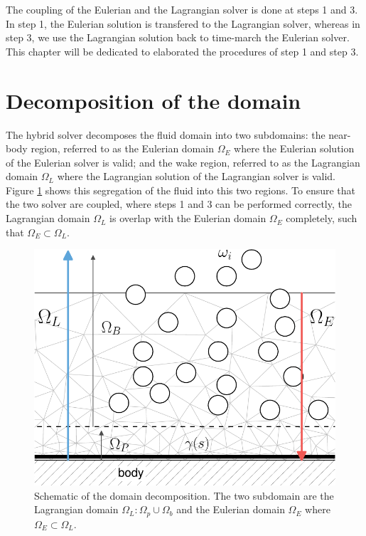 
The coupling of the Eulerian and the Lagrangian solver is done at steps 1 and 3. In step 1, the Eulerian solution is transfered to the Lagrangian solver, whereas in step 3, we use the Lagrangian solution back to time-march the Eulerian solver. This chapter will be dedicated to elaborated the procedures of step 1 and step 3.

\section{Decomposition of the domain}
The hybrid solver decomposes the fluid domain into two subdomains: the near-body region, referred to as the Eulerian domain $\Omega_E$ where the Eulerian solution of the Eulerian solver is valid; and the wake region, referred to as the Lagrangian domain $\Omega_L$ where the Lagrangian solution of the Lagrangian solver is valid. Figure \ref{fig:hybrid_domains} shows this segregation of the fluid into this two regions. To ensure that the two solver are coupled, where steps 1 and 3 can be performed correctly, the Lagrangian domain $\Omega_L$ is overlap with the Eulerian domain $\Omega_E$ completely, such that $\Omega_E \subset \Omega_L$. 
	\begin{figure}[h]
	\centering
	\includegraphics[width=0.45\linewidth]{./figures/hybrid/interpolation/hybrid_domains-crop.pdf}
	\caption{Schematic of the domain decomposition. The two subdomain are the Lagrangian domain $\Omega_L: \Omega_p \cup \Omega_b$ and the Eulerian domain $\Omega_E$ where $\Omega_E \subset \Omega_L$.}
	\label{fig:hybrid_domains}
	\end{figure}

